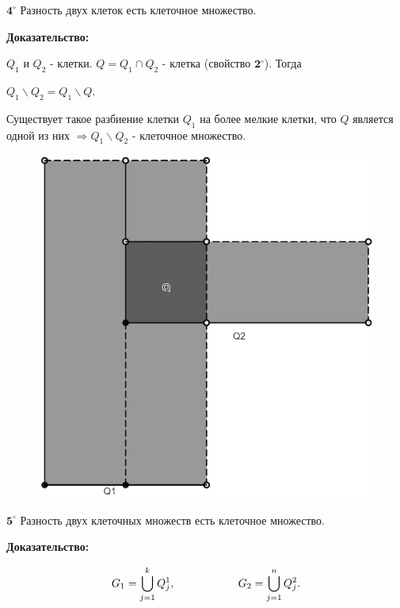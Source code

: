 \documentclass[a4paper,12pt]{article} %
\begin{document}
	\vspace{5mm}
	
	$\textbf{4}^\circ$ Разность двух клеток есть клеточное множество.
	
	\textbf{Доказательство:}
	
	$Q_1$ и $Q_2$ - клетки. $Q = Q_1 \cap Q_2$ - клетка (свойство $\textbf{2}^\circ$). Тогда
	
	$Q_1 \backslash Q_2 = Q_1 \backslash Q$.
	
	Существует такое разбиение клетки $Q_1$ на более мелкие клетки, что $Q$ является одной из них
	$\Rightarrow Q_1 \backslash Q_2$ - клеточное множество.
	
	\begin{figure}[h!]
		\centering
		\includegraphics[scale=0.1]{Q.jpg}
	\end{figure} 
	
	
	
	$\textbf{5}^\circ$ Разность двух клеточных множеств есть клеточное множество.
	
	\textbf{Доказательство:}
	
	\begin{equation*}
		G_1 = \bigcup_{j = 1}^k Q_j^1, \hspace{20mm} G_2 = \bigcup_{j = 1}^n Q_j^2.
	\end{equation*}
	
\end{document}
